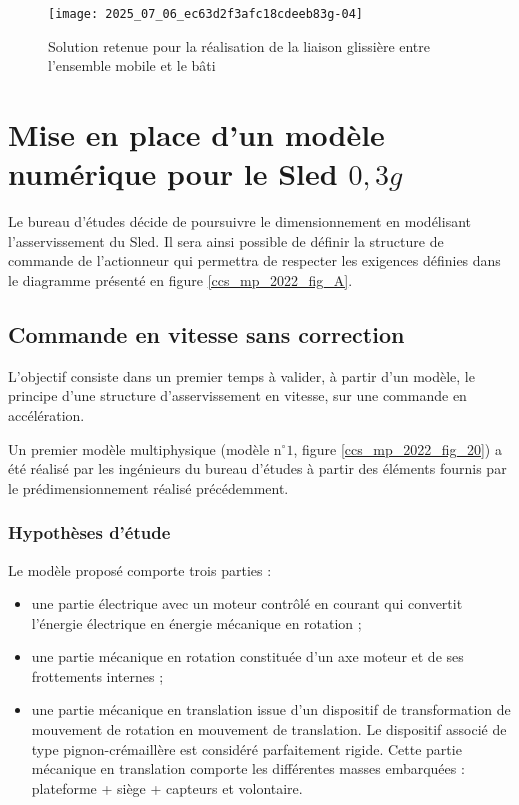 \begin{figure}[!h]
\centering
\texttt{[image: 2025\_07\_06\_ec63d2f3afc18cdeeb83g-04]}

\caption{\label{ccs_mp_2022_fig_06}Solution retenue pour la réalisation de la liaison glissière entre l'ensemble mobile et le bâti}
\end{figure}
\fi

\section{Mise en place d'un modèle numérique pour le Sled $0,3 g$ \label{ccs_mp_2022_sec_3}}

\ifprof
\else
Le bureau d'études décide de poursuivre le dimensionnement en modélisant l'asservissement du Sled. Il sera ainsi possible de définir la structure de commande de l'actionneur qui permettra de respecter les exigences définies dans le diagramme présenté en figure \ref{ccs_mp_2022_fig_A}.
\fi

\subsection{Commande en vitesse sans correction \label{ccs_mp_2022_sec_3A}}
\begin{obj}
L'objectif consiste dans un premier temps à valider, à partir d'un modèle, le principe d'une structure d'asservissement en vitesse, sur une commande en accélération.
\end{obj}

\ifprof
\else
Un premier modèle multiphysique (modèle $\mathrm{n}^{\circ} 1$, figure \ref{ccs_mp_2022_fig_20}) a été réalisé par les ingénieurs du bureau d'études à partir des éléments fournis par le prédimensionnement réalisé précédemment.

\subsubsection*{Hypothèses d'étude}
Le modèle proposé comporte trois parties :
\begin{itemize}
  \item une partie électrique avec un moteur contrôlé en courant qui convertit l'énergie électrique en énergie mécanique en rotation ;
  \item une partie mécanique en rotation constituée d'un axe moteur et de ses frottements internes ;
  \item une partie mécanique en translation issue d'un dispositif de transformation de mouvement de rotation en mouvement de translation. Le dispositif associé de type pignon-crémaillère est considéré parfaitement rigide. Cette partie mécanique en translation comporte les différentes masses embarquées : plateforme + siège + capteurs et volontaire.
\end{itemize}

